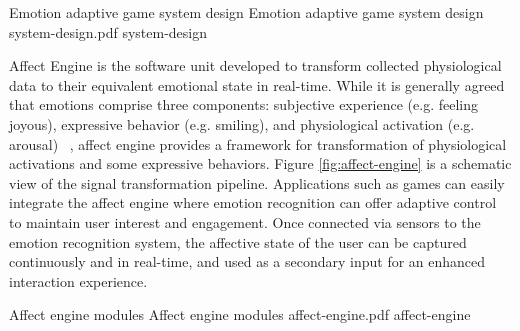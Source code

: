 \documentclass[conference]{IEEEtran}
\begin{document}
\img
{Emotion adaptive game system design}
{Emotion adaptive game system design}
{system-design.pdf}
{system-design}

Affect Engine is the software unit developed to transform collected physiological data to their equivalent emotional state in real-time. While it is generally agreed that emotions comprise three components: subjective experience (e.g. feeling joyous), expressive behavior (e.g. smiling), and physiological activation (e.g. arousal) ~\cite{scherer1993neuroscience}, affect engine provides a framework for transformation of physiological activations and some expressive behaviors. Figure \ref{fig:affect-engine} is a schematic view of the signal transformation pipeline. Applications such as games can easily integrate the affect engine where emotion recognition can offer adaptive control to maintain user interest and engagement. Once connected via sensors to the emotion recognition system, the affective state of the user can be captured continuously and in real-time, and used as a secondary input for an enhanced interaction experience.

\img
{Affect engine modules}
{Affect engine modules}
{affect-engine.pdf}
{affect-engine}
\end{document}
